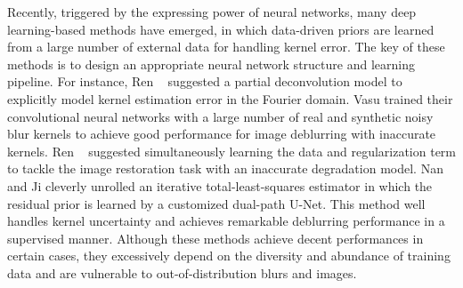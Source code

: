 \documentclass[10pt,twocolumn,letterpaper]{article}
\begin{document}
	Recently, triggered by the expressing power of neural networks, many deep learning-based methods \cite{ren2017partial, sun2015learning, vasu2018non, nan2020deep, ren2019simultaneous} have emerged, in which data-driven priors are learned from a large number of external data for handling kernel error. The key of these methods is to design an  appropriate neural network structure and learning pipeline. For instance, Ren \etal~ \cite{ren2017partial} suggested a partial deconvolution model to explicitly model kernel estimation error in the Fourier domain. Vasu \etal \cite{vasu2018non} trained their convolutional neural networks with a large number of real and synthetic noisy blur kernels to achieve good performance for image deblurring with inaccurate kernels. Ren \etal~\cite{ren2019simultaneous} suggested simultaneously learning the data and regularization term to tackle the image restoration task with an inaccurate degradation model. Nan and Ji \cite{nan2020deep} cleverly unrolled an iterative total-least-squares estimator in which the residual prior is learned by a customized dual-path U-Net. This method well handles kernel uncertainty  and achieves remarkable deblurring performance in a supervised manner. Although these methods achieve decent performances in certain cases, they excessively depend on the diversity and abundance of training data and are vulnerable to out-of-distribution blurs and images.
\end{document}
